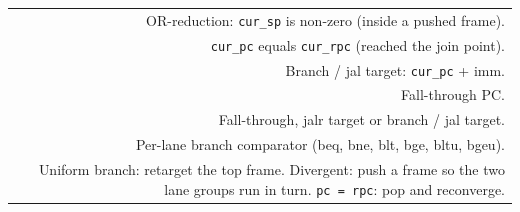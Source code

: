 \begin{minipage}[t]{0.245\linewidth}
\begin{tabularx}{\linewidth}[t]{@{}ND@{}}
 & OR-reduction: \texttt{cur\_sp} is non-zero (inside a pushed frame). \\
 & \texttt{cur\_pc} equals \texttt{cur\_rpc} (reached the join point). \\
\nm{+} & Branch / jal target: \texttt{cur\_pc} + imm. \\
 & Fall-through PC. \\
 & Fall-through, jalr target or branch / jal target. \\
 & Per-lane branch comparator (beq, bne, blt, bge, bltu, bgeu). \\
 & Uniform branch: retarget the top frame. Divergent: push a frame so the two lane groups run in turn. \texttt{pc = rpc}: pop and reconverge. \\
\end{tabularx}
\end{minipage}\hfill
